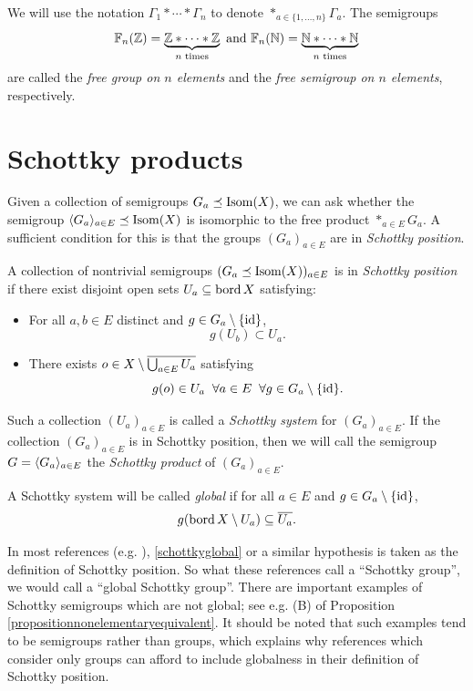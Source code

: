\begin{remark}
\label{remarkfreegroup}
We will use the notation $\Gamma_1\ast\cdots\ast \Gamma_n$ to denote $\ast_{a\in\{1,\ldots,n\}}\Gamma_a$. The semigroups
\[
\F_n(\Z) = \underbrace{\Z\ast \cdots\ast \Z}_{n\text{ times}} \text{ and } \F_n(\N) = \underbrace{\N\ast\cdots\ast\N}_{n\text{ times}}
\]
are called the \emph{free group on $n$ elements} and the \emph{free semigroup on $n$ elements}, respectively.
\end{remark}

\section{Schottky products}
\label{subsectionschottkyproducts}
Given a collection of semigroups $G_a \preceq \operatorname{Isom}(X)$, we can ask whether the semigroup $\langle G_a\rangle_{a\in E}\preceq\operatorname{Isom}(X)$ is isomorphic to the free product $\ast_{a\in E} G_a$. A sufficient condition for this is that the groups $(G_a)_{a\in E}$ are in \emph{Schottky position}.

\begin{definition}
\label{definitionschottkyproduct}
A collection of nontrivial semigroups $(G_a \preceq\operatorname{Isom}(X) )_{a\in E}$ is in \emph{Schottky position} if there exist disjoint open sets $U_a\subseteq\operatorname{bord} X$ satisfying:
\begin{itemize}
\item[(I)] For all $a,b\in E$ distinct and $g\in G_a\setminus\{\mathrm{id}\}$,
\[
g(U_b) \subset U_a.
\]
\item[(II)] There exists $o\in X\setminus \overline{\bigcup_{a\in E} U_a}$ satisfying
\begin{equation}
\label{zerodef}
g(o)\in U_a \;\;\forall a\in E \;\;\forall g\in G_a\setminus\{\mathrm{id}\}.
\end{equation}
\end{itemize}
Such a collection $(U_a)_{a\in E}$ is called a \emph{Schottky system} for $(G_a)_{a\in E}$. If the collection $(G_a)_{a\in E}$ is in Schottky position, then we will call the semigroup $G = \langle G_a\rangle_{a\in E}$ the \emph{Schottky product} of $(G_a)_{a\in E}$.

A Schottky system will be called \emph{global} if for all $a\in E$ and $g\in G_a\setminus\{\mathrm{id}\}$,
\begin{equation}
\label{schottkyglobal}
g(\operatorname{bord} X\setminus U_a) \subseteq \overline{U_a}.
\end{equation}
\end{definition}

\begin{remark*}
In most references (e.g. \cite[]{DPPS}), \eqref{schottkyglobal} or a similar hypothesis is taken as the definition of Schottky position. So what these references call a ``Schottky group'', we would call a ``global Schottky group''. There are important examples of Schottky semigroups which are not global; see e.g. (B) of Proposition \ref{propositionnonelementaryequivalent}. It should be noted that such examples tend to be semigroups rather than groups, which explains why references which consider only groups can afford to include globalness in their definition of Schottky position.
\end{remark*}

